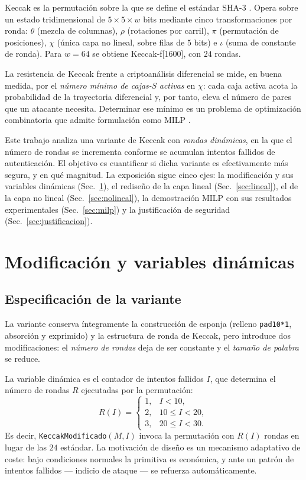 \documentclass[conference]{IEEEtran}
\begin{document}
Keccak es la permutación sobre la que se define el estándar SHA-3 \cite{fips202,keccak}.
Opera sobre un estado tridimensional de $5\times5\times w$ bits mediante cinco
transformaciones por ronda: $\theta$ (mezcla de columnas), $\rho$ (rotaciones por
carril), $\pi$ (permutación de posiciones), $\chi$ (única capa no lineal, sobre filas de
$5$ bits) e $\iota$ (suma de constante de ronda). Para $w=64$ se obtiene
Keccak-f[1600], con $24$ rondas.

La resistencia de Keccak frente a criptoanálisis diferencial se mide, en buena medida,
por el \emph{número mínimo de cajas-S activas} en $\chi$: cada caja activa acota la
probabilidad de la trayectoria diferencial y, por tanto, eleva el número de pares que
un atacante necesita. Determinar ese mínimo es un problema de optimización combinatoria
que admite formulación como MILP \cite{mouha}.

Este trabajo analiza una variante de Keccak con \emph{rondas dinámicas}, en la que el
número de rondas se incrementa conforme se acumulan intentos fallidos de autenticación.
El objetivo es cuantificar si dicha variante es efectivamente más segura, y en qué
magnitud. La exposición sigue cinco ejes: la modificación y sus variables dinámicas
(Sec.~\ref{sec:mod}), el rediseño de la capa lineal (Sec.~\ref{sec:lineal}), el de la
capa no lineal (Sec.~\ref{sec:nolineal}), la demostración MILP con sus resultados
experimentales (Sec.~\ref{sec:milp}) y la justificación de seguridad
(Sec.~\ref{sec:justificacion}).

\section{Modificación y variables dinámicas}\label{sec:mod}

\subsection{Especificación de la variante}

La variante conserva íntegramente la construcción de esponja (relleno \texttt{pad10*1},
absorción y exprimido) y la estructura de ronda de Keccak, pero introduce dos
modificaciones: el \emph{número de rondas} deja de ser constante y el \emph{tamaño de
palabra} se reduce.

La variable dinámica es el contador de intentos fallidos $I$, que determina el número de
rondas $R$ ejecutadas por la permutación:
\begin{equation}\label{eq:rondas}
R(I)=
\begin{cases}
1, & I<10,\\
2, & 10\le I<20,\\
3, & 20\le I<30.
\end{cases}
\end{equation}
Es decir, \texttt{KeccakModificado}$(M,I)$ invoca la permutación con $R(I)$ rondas en
lugar de las $24$ estándar. La motivación de diseño es un mecanismo adaptativo de coste:
bajo condiciones normales la primitiva es económica, y ante un patrón de intentos
fallidos --- indicio de ataque --- se refuerza automáticamente.
\end{document}

